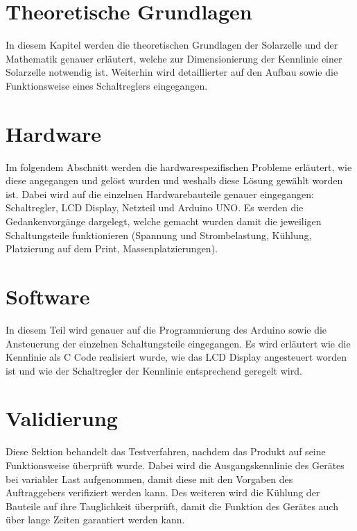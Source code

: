 \documentclass[a4paper]{fhnwreport} %
\begin{document}
\section{Theoretische Grundlagen}

In diesem Kapitel werden die theoretischen Grundlagen der Solarzelle und der Mathematik genauer erläutert, welche zur Dimensionierung der Kennlinie einer Solarzelle notwendig ist. Weiterhin wird detaillierter auf den Aufbau sowie die Funktionsweise eines Schaltreglers eingegangen. 

\section{Hardware} 

Im folgendem Abschnitt werden die hardwarespezifischen Probleme erläutert, wie diese angegangen und gelöst wurden und weshalb diese Lösung gewählt worden ist. Dabei wird auf die einzelnen Hardwarebauteile genauer eingegangen: Schaltregler, LCD Display, Netzteil und Arduino UNO. Es werden die Gedankenvorgänge dargelegt, welche gemacht wurden damit die jeweiligen Schaltungsteile funktionieren (Spannung und Strombelastung, Kühlung, Platzierung auf dem Print, Massenplatzierungen).

\section{Software}

In diesem Teil wird genauer auf die Programmierung des Arduino sowie die Ansteuerung der einzelnen Schaltungsteile eingegangen. Es wird erläutert wie die Kennlinie als C Code realisiert wurde, wie das LCD Display angesteuert worden ist und wie der Schaltregler der Kennlinie entsprechend geregelt wird. 

\section{Validierung}

Diese Sektion behandelt das Testverfahren, nachdem das Produkt auf seine Funktionsweise überprüft wurde. Dabei wird die Ausgangskennlinie des Gerätes bei variabler Last aufgenommen, damit diese mit den Vorgaben des Auftraggebers verifiziert werden kann. Des weiteren wird die Kühlung der Bauteile auf ihre Tauglichkeit überprüft, damit die Funktion des Gerätes auch über lange Zeiten garantiert werden kann. 
\end{document}
